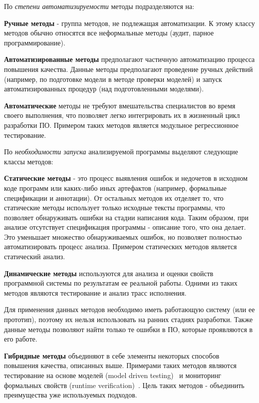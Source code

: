 По \emph{степени автоматизируемости} методы подразделяются на:

\textbf{Ручные методы} - группа методов, не подлежащая автоматизации. К этому
классу методов обычно относятся все неформальные методы (аудит, парное
программирование).

\textbf{Автоматизированные методы} предполагают частичную автоматизацию процесса
повышения качества. Данные методы предполагают проведение ручных действий
(например, по подготовке модели в методе проверки моделей) и запуск
автоматизированных процедур (над подготовленными моделями).

\textbf{Автоматические} методы не требуют вмешательства специалистов во время
своего выполнения, что позволяет легко интегрировать их в жизненный цикл
разработки ПО. Примером таких методов является модульное регрессионное
тестирование.

По \emph{необходимости запуска} анализируемой программы выделяют следующие
классы методов:

\textbf{Статические методы} - это процесс выявления ошибок и недочетов в
исходном коде программ или каких-либо иных артефактов (например, формальные
спецификации и аннотации). От остальных методов их отделяет то, что статические
методы использует только исходные тексты программы, что позволяет обнаруживать
ошибки на стадии написания кода. Таким образом, при анализе отсутствует
спецификация программы - описание того, что она делает. Это уменьшает множество
обнаруживаемых ошибок, но позволяет полностью автоматизировать процесс анализа.
Примером статических методов является статический анализ.

\textbf{Динамические методы} используются для анализа и оценки свойств
программной системы по результатам ее реальной работы. Одними из таких методов
являются тестирование и анализ трасс исполнения.

Для применения данных методов необходимо иметь работающую систему (или ее
прототип), поэтому их нельзя использовать на ранних стадиях разработки. Также
данные методы позволяют найти только те ошибки в ПО, которые проявляются в его
работе.

\textbf{Гибридные методы} объединяют в себе элементы некоторых способов
повышения качества, описанных выше. Примерами таких методов являются
тестирование на основе моделей (model driven testing)~\cite{Vieira2006} и
мониторинг формальных свойств (runtime
verification)~\cite{runtime_verification}. Цель таких методов - объединить
преимущества уже используемых подходов.

